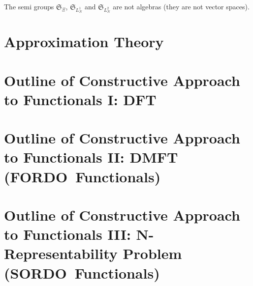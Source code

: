 \documentclass[aps,preprint]{revtex4}
\begin{document}
The semi groups $\mathfrak{S}_{\Xi }$, $\mathfrak{S}_{L_{N}^{1}}$ and $%
\mathfrak{S}_{L_{N}^{2}}$ are not algebras (they are not vector spaces).

\section{Approximation Theory}

\section{Outline of Constructive Approach to Functionals I: DFT}

\bigskip

\bigskip

\section{Outline of Constructive Approach to Functionals II: DMFT (FORDO\
Functionals)}

\bigskip

\bigskip

\section{\protect\bigskip Outline of Constructive Approach to Functionals
III: N-Representability Problem (SORDO\ Functionals)}
\end{document}
